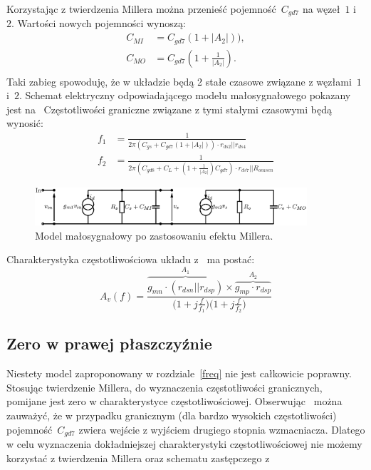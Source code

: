 \documentclass[twoside,pl,final]{labman}
\begin{document}
Korzystając z twierdzenia Millera można przenieść
pojemność~$C_{gd7}$ na węzeł~$1$ i~$2$.
Wartości nowych pojemności wynoszą:
\begin{align}
  C_{MI} &= C_{gd7}(1 + |A_2|)), \\
  C_{MO} &= C_{gd7}(1 + \frac{1}{|A_2|}). \\
\end{align}
Taki zabieg spowoduję, że w układzie będą
2 stałe czasowe związane z węzłami~$1$ i~$2$.
Schemat elektryczny odpowiadającego modelu
małosygnałowego pokazany jest na~
Częstotliwości graniczne związane z tymi stałymi czasowymi będą wynosić:
\begin{align}
  f_1 &= \frac{1}{2 \pi (C_{gs} + C_{gd7}(1 + |A_2|)) \cdot r_{ds2} || r_{ds4}}
  \label{eqn:freq:pole:low} \\
  f_2 &= \frac{1}{2 \pi (C_{gd8} + C_L + (1 + \frac{1}{|A_2|})C_{gd7}) \cdot
  r_{ds7} || R_{ocascn}}
  \label{eqn:freq:pole:high}
\end{align}

\begin{figure}[!htbp]
  \centering
  \includegraphics[width=0.9\textwidth]{miller}
  \caption{Model małosygnałowy po zastosowaniu efektu Millera.}
  \label{fig:miller}
\end{figure}

Charakterystyka częstotliwościowa układu z~ ma postać:
\begin{equation}
  A_v(f) = \frac{\overbrace{g_{mn} \cdot (r_{dsn} || r_{dsp})}^{A_1} \times
                 \overbrace{g_{mp} \cdot r_{dsp}}^{A_2}}
                {\Big(1 + j \frac{f}{f_1}\Big)\Big(1 + j \frac{f}{f_2}\Big)}
\end{equation}

\subsection{Zero w prawej płaszczyźnie}
\label{freq:rhp}
Niestety model zaproponowany w rozdziale~\ref{freq}
nie jest całkowicie poprawny.
Stosując twierdzenie Millera, do wyznaczenia częstotliwości granicznych,
pomijane jest zero w charakterystyce częstotliwościowej.
Obserwując~ można zauważyć,
że w przypadku granicznym (dla bardzo wysokich częstotliwości)
pojemność~$C_{gd7}$ zwiera wejście z wyjściem drugiego stopnia wzmacniacza.
Dlatego w celu wyznaczenia dokładniejszej charakterystyki częstotliwościowej
nie możemy korzystać z twierdzenia Millera
oraz schematu zastępczego z~
\end{document}

